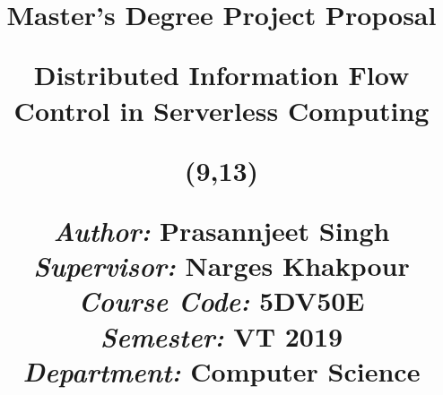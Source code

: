 \title{	
	\vspace{-8cm}
	\begin{sidebar}
		\vspace{10cm}
		\normalfont \normalsize
		\Huge Master's Degree Project Proposal \\
		\vspace{-1.3cm}
	\end{sidebar}
	\vspace{3cm}
	\begin{flushleft}
		\huge Distributed Information Flow Control in Serverless Computing\\ 
	\end{flushleft}
	\null
	\vfill
	\begin{textblock}{6}(9,13)
		\begin{flushright}
			\begin{minipage}{\textwidth}
				\begin{flushleft} \large
					\emph{Author:} Prasannjeet Singh\\ %
					\emph{Supervisor:} Narges Khakpour\\ %
					\emph{Course Code:} 5DV50E\\
					\emph{Semester:} VT 2019\\ %
					\emph{Department:} Computer Science\\ %
				\end{flushleft}
			\end{minipage}
		\end{flushright}
	\end{textblock}
}

\date{} 